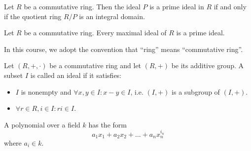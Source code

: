 \begin{prop}
  Let $R$ be a commutative ring. Then the ideal $P$ is a prime ideal in $R$ if
  and only if the quotient ring $R/P$ is an integral domain.
\end{prop}


\begin{prop}
  Let $R$ be a commutative ring. Every maximal ideal of $R$ is a prime ideal.
\end{prop}

\begin{remark}
  In this course, we adopt the convention that ``ring'' means ``commutative
  ring''.
\end{remark}


\begin{defn}
  Let $(R,+,\cdot)$ be a commutative ring and let $(R, +)$ be its additive
  group. A subset $I$ is called an ideal if it satisfies:
  \begin{itemize}
    \item $I$ is nonempty and $\forall x,y \in I : x-y \in I$, i.e. $(I,+)$ is a
    subgroup of $(I,+)$.
    \item $\forall r \in R, i \in I : ri \in I$.
  \end{itemize}
\end{defn}


\begin{defn}
  A polynomial over a field $k$ has the form
  \[ a_1 x_1 + a_2 x_2 + \ldots + a_n x_n^{i_n}\]
  where $a_i \in k$.
\end{defn}
